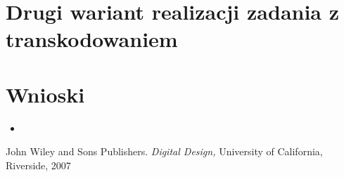 \documentclass{classrep}
\begin{document}
\section{Drugi wariant realizacji zadania z transkodowaniem}

\section{Wnioski}
\begin{itemize}
	\item 
\end{itemize}

\begin{thebibliography}{0}
   John Wiley and Sons Publishers.
    \textsl{Digital Design,} University of California, Riverside, 2007
\end{thebibliography}
\end{document}
